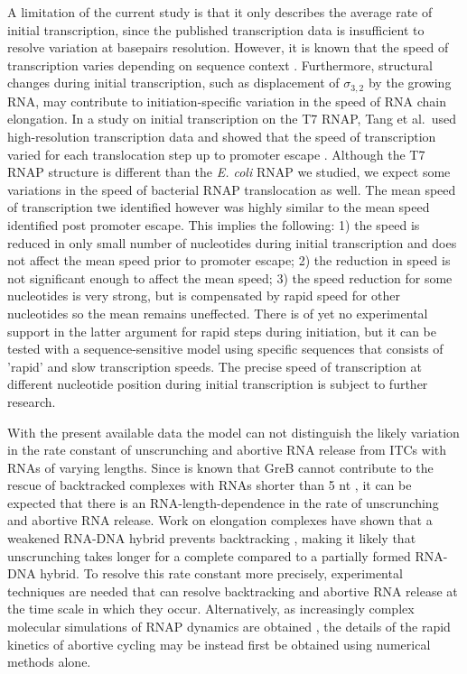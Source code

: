 A limitation of the current study is that it only describes the average rate
of initial transcription, since the published transcription data is
insufficient to resolve variation at basepairs resolution. However, it is
known that the speed of transcription varies depending on sequence context
\cite{bai_mechanochemical_2007,malinen_active_2012}. Furthermore, structural
changes during initial transcription, such as displacement of $\sigma_{3,2}$
by the growing RNA, may contribute to initiation-specific variation in the
speed of RNA chain elongation. In a study on initial transcription on the T7
RNAP, Tang et al.\ used high-resolution transcription data and showed that the
speed of transcription varied for each translocation step up to promoter
escape \cite{tang_real-time_2009}. Although the T7 RNAP structure is different
than the \textit{E. coli} RNAP we studied, we expect some variations in the
speed of bacterial RNAP translocation as well. The mean speed of transcription
twe identified however was highly similar to the mean speed identified post
promoter escape. This implies the following: 1) the speed is reduced in only
small number of nucleotides during initial transcription and does not affect
the mean speed prior to promoter escape; 2) the reduction in speed is not
significant enough to affect the mean speed; 3) the speed reduction for some
nucleotides is very strong, but is compensated by rapid speed for other
nucleotides so the mean remains uneffected. There is of yet no experimental
support in the latter argument for rapid steps during initiation, but it can
be tested with a sequence-sensitive model using specific sequences that
consists of 'rapid' and slow transcription speeds. The precise speed of
transcription at different nucleotide position during initial transcription is
subject to further research.

With the present available data the model can not distinguish the likely
variation in the rate constant of unscrunching and abortive RNA release from
ITCs with RNAs of varying lengths. Since is known that GreB cannot contribute
to the rescue of backtracked complexes with RNAs shorter than 5 nt
\cite{hsu_initial_2006}, it can be expected that there is an
RNA-length-dependence in the rate of unscrunching and abortive RNA release.
Work on elongation complexes have shown that a weakened RNA-DNA hybrid
prevents backtracking \cite{nudler_rnadna_1997}, making it likely that
unscrunching takes longer for a complete compared to a partially formed
RNA-DNA hybrid. To resolve this rate constant more precisely, experimental
techniques are needed that can resolve backtracking and abortive RNA release
at the time scale in which they occur. Alternatively, as increasingly complex
molecular simulations of RNAP dynamics are obtained
\cite{silva_millisecond_2014}, the details of the rapid kinetics of abortive
cycling may be instead first be obtained using numerical methods alone.

